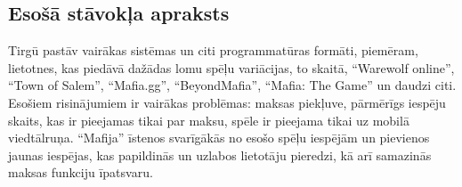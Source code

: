 \subsection{Esošā stāvokļa apraksts}
Tirgū pastāv vairākas sistēmas un citi programmatūras formāti, piemēram,
lietotnes, kas piedāvā dažādas lomu spēļu variācijas, to skaitā, ``Warewolf
online'', ``Town of Salem'', ``Mafia.gg'', ``BeyondMafia'', ``Mafia: The Game''
un daudzi citi. Esošiem risinājumiem ir vairākas problēmas: maksas piekļuve,
pārmērīgs iespēju skaits, kas ir pieejamas tikai par maksu, spēle ir pieejama
tikai uz mobilā viedtālruņa. “Mafija” īstenos svarīgākās no esošo spēļu
iespējām un pievienos jaunas iespējas, kas papildinās un uzlabos lietotāju
pieredzi, kā arī samazinās maksas funkciju īpatsvaru.
